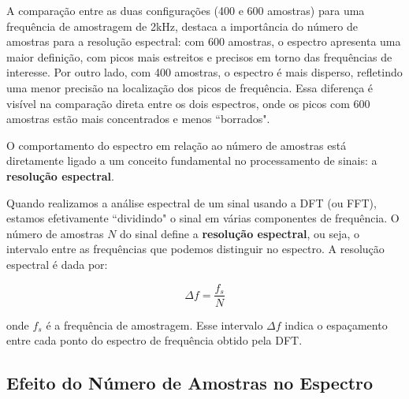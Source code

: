 

A comparação entre as duas configurações (400 e 600 amostras) para uma frequência de amostragem de 2kHz, destaca a importância do número de amostras para a resolução espectral: com 600 amostras, o espectro apresenta uma maior definição, com picos mais estreitos e precisos em torno das frequências de interesse. Por outro lado, com 400 amostras, o espectro é mais disperso, refletindo uma menor precisão na localização dos picos de frequência. Essa diferença é visível na comparação direta entre os dois espectros, onde os picos com 600 amostras estão mais concentrados e menos ``borrados".

O comportamento do espectro em relação ao número de amostras está diretamente ligado a um conceito fundamental no processamento de sinais: a \textbf{resolução espectral}.

Quando realizamos a análise espectral de um sinal usando a DFT (ou FFT), estamos efetivamente ``dividindo" o sinal em várias componentes de frequência. O número de amostras \( N \) do sinal define a \textbf{resolução espectral}, ou seja, o intervalo entre as frequências que podemos distinguir no espectro. A resolução espectral é dada por:

\[
\Delta f = \frac{f_s}{N}
\]

onde \( f_s \) é a frequência de amostragem. Esse intervalo \(\Delta f\) indica o espaçamento entre cada ponto do espectro de frequência obtido pela DFT.

\subsection*{Efeito do Número de Amostras no Espectro}

